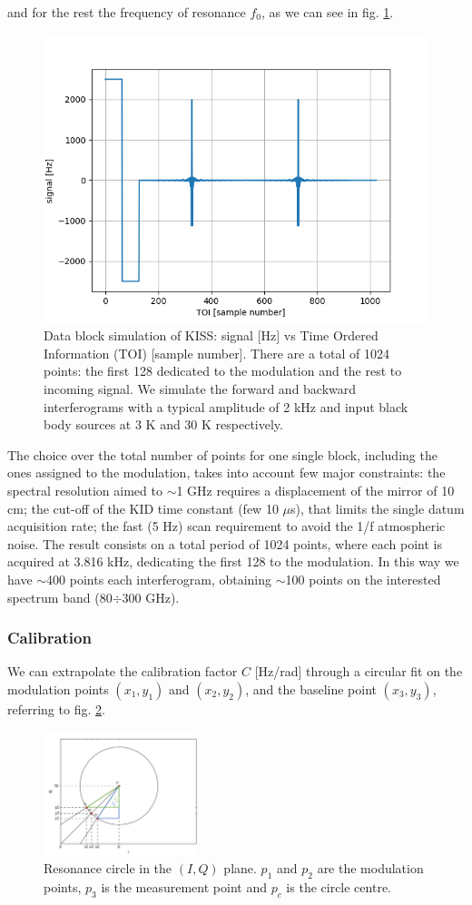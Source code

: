 \documentclass[twocolumn,traditabstract]{aa}\\
\begin{document}
\noindent and for the rest the frequency of resonance $f_0$, as we can see in fig. \ref{fig:mod}.

\begin{figure}[htf]
	\centering
	\includegraphics[width=.5\textwidth]{3.acqui/block_data.png}
	\caption{Data block simulation of KISS: signal [Hz] vs Time Ordered Information (TOI) [sample number]. There are a total of 1024 points: the first 128 dedicated to the modulation and the rest to incoming signal. We simulate the forward and backward interferograms with a typical amplitude of 2 kHz and input black body sources at 3 K and 30 K respectively.}
	\label{fig:mod}
\end{figure}

\noindent The choice over the total number of points for one single block, including the ones assigned to the modulation, takes into account few major constraints: the spectral resolution aimed to $\sim$1 GHz requires a displacement of the mirror of 10 cm; the cut-off of the KID time constant (few 10 $\mu$s), that limits the single datum acquisition rate; the fast (5 Hz) scan requirement to avoid the 1/f atmospheric noise. The result consists on a total period of 1024 points, where each point is acquired at 3.816 kHz, dedicating the first 128 to the modulation. In this way we have $\sim$400 points each interferogram, obtaining $\sim$100 points on the interested spectrum band (80$\div$300 GHz).

\subsubsection{Calibration}
\label{calib}

\noindent We can extrapolate the calibration factor $C$ [Hz/rad] through a circular fit on the modulation points $(x_1,y_1)$ and $(x_2,y_2)$, and the baseline point $(x_3,y_3)$, referring to fig. \ref{fig:IQ_modulation}. 

\begin{figure}[htf]
	\centering
	\includegraphics[width=0.4\textwidth]{3.acqui/circle.png}
	\caption{Resonance circle in the $(I,Q)$ plane. $p_1$ and $p_2$ are the modulation points, $p_3$ is the measurement point and $p_c$ is the circle centre. }
	\label{fig:IQ_modulation}
\end{figure}
\end{document}
